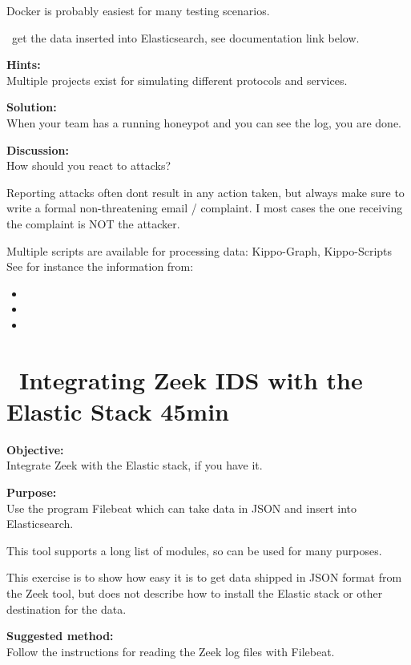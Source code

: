 \documentclass[a4paper,11pt,notitlepage]{report}
\begin{document}
Docker is probably easiest for many testing scenarios.

\faInfoCircle\ get the data inserted into Elasticsearch, see documentation link below.

{\bf Hints:}\\
Multiple projects exist for simulating different protocols and services.

{\bf Solution:}\\
When your team has a running honeypot and you can see the log, you are done.

{\bf Discussion:}\\
How should you react to attacks?

Reporting attacks often dont result in any action taken, but always make sure to write a formal non-threatening email / complaint. I most cases the one receiving the complaint is NOT the attacker.

Multiple scripts are available for processing data: Kippo-Graph, Kippo-Scripts
See for instance the information from:
\begin{itemize}
\item {}
\item {}
\item {}
\end{itemize}



\chapter{\faExclamationTriangle\ Integrating Zeek IDS with the Elastic Stack 45min}
\label{ex:zeek-to-elastic}

{\bf Objective:}\\
Integrate Zeek with the Elastic stack, if you have it.

{\bf Purpose:}\\
Use the program Filebeat which can take data in JSON and insert into Elasticsearch.

This tool supports a long list of modules, so can be used for many purposes.

This exercise is to show how easy it is to get data shipped in JSON format from the Zeek tool, but does not describe how to install the Elastic stack or other destination for the data.

{\bf Suggested method:}\\
Follow the instructions for reading the Zeek log files with Filebeat.
\end{document}
